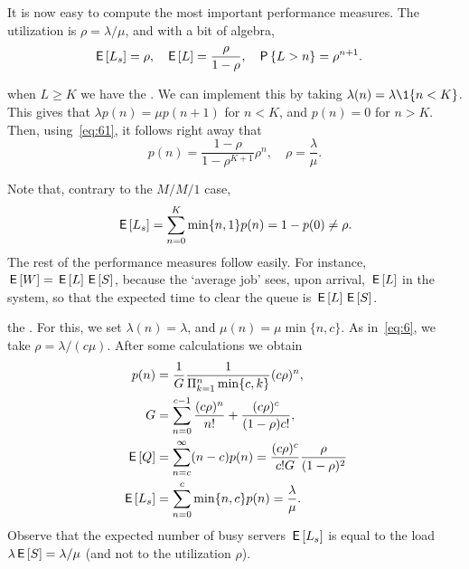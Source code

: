 It is now easy to compute the most important performance measures.
The utilization is $\rho=\lambda/\mu$, and with a bit of algebra,
\begin{align}\label{eq:el}
\,\mathsf{E}\left[L_s\right] &= \rho, & \,\mathsf{E}\left[L\right] &= \frac \rho{1-\rho}, & \,\mathsf{P}\left\{L> n\right\} &= \rho^{n+1}.
\end{align}


 when $L\geq K$  we have the .
We can implement this by taking $\lambda(n) = \lambda \1{n < K}$.
This gives that $\lambda p(n) = \mu p(n+1)$ for $n<K$, and $p(n) = 0$ for $n>K$.
Then, using~\cref{eq:61}, it follows right away  that
 \begin{equation*}
p(n) = \frac{1-\rho}{1-\rho^{K+1}} \rho^n, \quad \rho = \frac{\lambda}{\mu}.
\end{equation*}

Note that, contrary to the $M/M/1$ case, 
\begin{equation*}
\,\mathsf{E}\left[L_s\right] = \sum_{n=0}^K \min\{n, 1\} p(n) = 1-p(0) \neq \rho.
\end{equation*}
The rest of the performance measures follow easily.
For instance, $\,\mathsf{E}\left[W\right] = \,\mathsf{E}\left[L\right] \,\mathsf{E}\left[S\right]$, because the `average job' sees, upon arrival, $\,\mathsf{E}\left[L\right]$ in the system, so that the expected time to clear the queue is $\,\mathsf{E}\left[L\right] \,\mathsf{E}\left[S\right]$.

 the .
For this, we set $\lambda(n) = \lambda$, and $\mu(n) = \mu \min\{n, c\}$.
As in~\cref{eq:6}, we take $\rho=\lambda/(c\mu)$.
After some calculations we obtain
\begin{subequations}
\begin{align}
p(n) &= \frac 1 {G} \frac{1}{\Pi_{k=1}^{n}\min\{c, k\}}(c\rho)^{n} , \label{eq:1}\\
G &=\sum_{n=0}^{c-1} \frac{(c\rho)^n}{n!} + \frac{(c\rho)^c}{(1-\rho)c!}, \label{eq:501}\\
\,\mathsf{E}\left[Q\right] &= \sum_{n=c}^\infty (n-c) p(n) = \frac{(c\rho)^c}{c! G}\frac{\rho}{(1-\rho)^2}\\ 
\,\mathsf{E}\left[L_s\right] &= \sum_{n=0}^{c}\min\{n,c\} p(n)= \frac{\lambda}\mu.
\end{align}
\end{subequations}
Observe that the expected number of busy servers $\,\mathsf{E}\left[L_s\right]$ is equal to the load $\lambda \,\mathsf{E}\left[S\right]=\lambda/\mu$ (and not to the utilization $\rho$).


